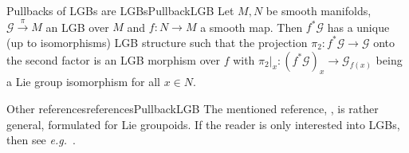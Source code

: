 \documentclass[reqno,a4paper,oneside]{amsart}
\theoremstyle{plain}
\theoremstyle{remark}
\theoremstyle{definition}
\def\ba#1\ea{\begin{align}#1\end{align}}
\def\bas#1\eas{\begin{align*}#1\end{align*}}
\begin{document}
\begin{corollaries}{Pullbacks of LGBs are LGBs}{PullbackLGB}
Let $M, N$ be smooth manifolds, $\mathcal{G} \stackrel{\pi}{\to} M$ an LGB over $M$ and $f\colon N \to M$ a smooth map. Then $f^*\mathcal{G}$ has a unique (up to isomorphisms) LGB structure such that the projection $\pi_2\colon f^*\mathcal{G} \to \mathcal{G}$ onto the second factor is an LGB morphism over $f$ with $\pi_2|_x \colon (f^*\mathcal{G})_x \to \mathcal{G}_{f(x)}$ being a Lie group isomorphism for all $x \in N$.
%
\end{corollaries}

\begin{remarks}{Other references}{referencesPullbackLGB}
The mentioned reference, \cite{mackenzieGeneralTheory}, is rather general, formulated for Lie groupoids. If the reader is only interested into LGBs, then see \textit{e.g.}\ \cite[\S 3, Thm.\ 3.1]{PullbackLGBLAB}.
\end{remarks}
%
%
\end{document}

